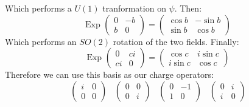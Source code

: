 \documentclass[12 pt]{article}
\begin{document}
Which performs a $U(1)$ tranformation on $\psi$. Then:
\[             \text{Exp }  \left( \begin{array} {cc}  0 & -b \\ b & 0  \end{array}   \right) =   \left( \begin{array} {cc}  \cos b & -\sin b \\ \sin b & \cos b  \end{array}   \right)                      \]
Which performs an $SO(2)$ rotation of the two fields. Finally:
\[           \text{Exp }  \left( \begin{array} {cc}  0 & c i \\ c i & 0  \end{array}   \right) =   \left( \begin{array} {cc}  \cos c & i \sin c \\ i \sin c & \cos c  \end{array}   \right)          \]
Therefore we can use this basis as our charge operators:
\[           \left( \begin{array} {cc}  i & 0 \\ 0 & 0  \end{array}   \right)  \;\;\;  \left( \begin{array} {cc}  0 & 0 \\ 0 & i  \end{array}   \right)  \;\;\;  \left( \begin{array} {cc}  0 & - 1 \\  1 & 0  \end{array}   \right)   \;\;\; \left( \begin{array} {cc}  0 & i \\  i & 0  \end{array}   \right)       \]
\end{document}
